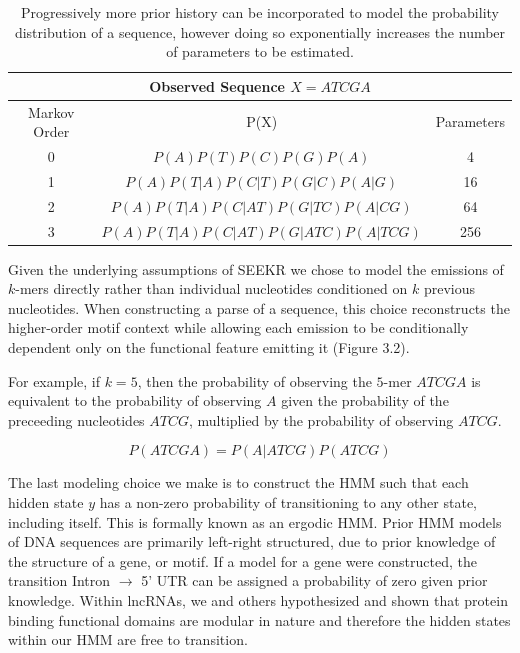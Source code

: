 \begin{table}[h!]
\centering
 \begin{tabular}{|c | c| c |}
 \hline
 \multicolumn{3}{|c|}{Observed Sequence $X = ATCGA$}\\
 \hline
 Markov Order & P(X) & Parameters\\
 \hline\hline
 0 & $P(A)P(T)P(C)P(G)P(A)$ & 4 \\ 
 \hline
 1 & $P(A)P(T|A)P(C|T)P(G|C)P(A|G)$ & 16\\
 \hline
 2 & $P(A)P(T|A)P(C|AT)P(G|TC)P(A|CG)$ & 64 \\
 \hline
 3 & $P(A)P(T|A)P(C|AT)P(G|ATC)P(A|TCG)$ & 256 \\
 \hline
 
\end{tabular}
\caption{Progressively more prior history can be incorporated to model the probability distribution of a sequence, however doing so exponentially increases the number of parameters to be estimated.}
\label{table:1}
\end{table}


Given the underlying assumptions of SEEKR we chose to model the emissions of $k$-mers directly rather than individual nucleotides conditioned on $k$ previous nucleotides. When constructing a parse of a sequence, this choice reconstructs the higher-order motif context while allowing each emission to be conditionally dependent only on the functional feature emitting it (Figure 3.2).

For example, if $k=5$, then the probability of observing the $5$-mer $ATCGA$ is equivalent to the probability of observing $A$ given the probability of the preceeding nucleotides $ATCG$, multiplied by the probability of observing $ATCG$. 

$$P(ATCGA) = P(A|ATCG)P(ATCG)$$

The last modeling choice we make is to construct the HMM such that each hidden state $y$ has a non-zero probability of transitioning to any other state, including itself. This is formally known as an ergodic HMM. Prior HMM models of DNA sequences are primarily left-right structured, due to prior knowledge of the structure of a gene, or motif. If a model for a gene were constructed, the transition Intron $\rightarrow$ 5' UTR can be assigned a probability of zero given prior knowledge. Within lncRNAs, we and others hypothesized and shown that protein binding functional domains are modular in nature and therefore the hidden states within our HMM are free to transition.

